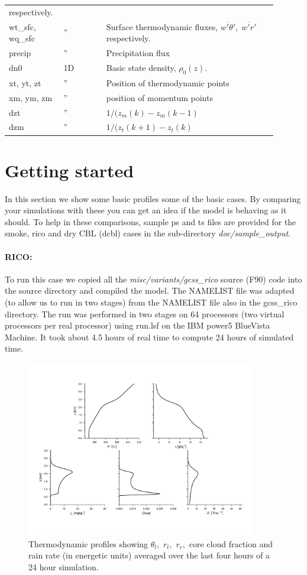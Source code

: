 \documentclass[11pt,a4paper]{article}
\begin{document}
\begin{longtable}[htb]{p{0.15\linewidth}p{0.15\linewidth}p{0.6\linewidth}}
respectively. \\  
wt\_sfc, wq\_sfc & '' & Surface thermodynamic fluxes,
$\overline{w'\theta'}, \;\overline{w'r'} $
respectively. \\
precip & '' &  Precipitation flux \\
dn0    & 1D &  Basic state density, $\rho_0(z).$ \\
xt, yt, zt & '' & Position of thermodynamic points \\
xm, ym, zm & '' & position of momentum points \\
dzt        & '' & $1/(z_m(k) - z_m(k-1)$ \\
dzm        & '' & $1/(z_t(k+1) - z_t(k)$ \\
\hline
\end{longtable}

\section{Getting started}

In this section we show some basic profiles some of the basic cases.
By comparing your simulations with these you can get an idea if the
model is behaving as it should.  To help in these comparisons, sample
ps and ts files are provided for the smoke, rico and dry CBL (dcbl)
cases in the sub-directory \emph{doc/sample\_output}.

\paragraph{RICO:}  To run this case we copied all the 
\emph{misc/variants/gcss\_rico} source (F90) code into the source
directory and compiled the model.  The NAMELIST file was adapted (to
allow us to run in two stages) from the NAMELIST file also in the
gcss\_rico directory.  The run was performed in two stages on 64
processors (two virtual processors per real processor) using run.lsf
on the IBM power5 BlueVista Machine.  It took about 4.5 hours of real
time to compute 24 hours of simulated time.

\begin{figure}[htb]
\centering \leavevmode 
\includegraphics[width=10cm]{rico}
\caption{Thermodynamic profiles showing $\theta_l,$ $r_t,$ $r_c,$ core
cloud fraction and rain rate (in energetic units) averaged over the
last four hours of a 24 hour simulation.}
\label{fig:rico}
\end{figure}
\end{document}
